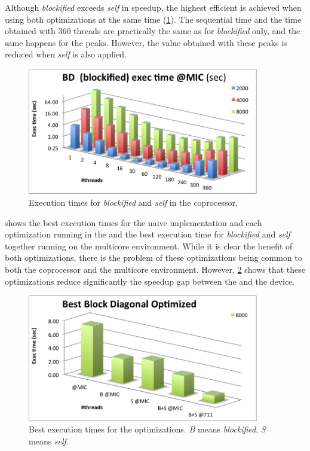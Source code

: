 \documentclass[../thesis]{subfiles}
\begin{document}
	Although \emph{blockified} exceeds \emph{self} in speedup, the highest efficient is achieved when using both optimizations at the same time (\cref{fig:mic:optims:blockified_self:times}). The sequential time and the time obtained with 360 threads are practically the same as for \emph{blockified} only, and the same happens for the peaks. However, the value obtained with these peaks is reduced when \emph{self} is also applied.

	\begin{figure}[p]
		\begin{center}
			\includegraphics[width=0.9\textwidth]{assets/images/mic/optims/mic-blockified.png}
		\end{center}
		\caption{Execution times for \emph{blockified} and \emph{self} in the \intel\xeonphi coprocessor.}
		\label{fig:mic:optims:blockified_self:times}
	\end{figure}

	 shows the best execution times for the naive implementation and each optimization running in the \intel\xeonphi and the best execution time for \emph{blockified} and \emph{self} together running on the multicore environment. While it is clear the benefit of both optimizations, there is the problem of these optimizations being common to both the coprocessor and the multicore environment. However, \cref{fig:mic:optims:best:times} shows that these optimizations reduce significantly the speedup gap between the \cpu and the device.

	\begin{figure}[p]
		\begin{center}
			\includegraphics[width=0.9\textwidth]{assets/images/mic/optims/best.png}
		\end{center}
		\caption{Best execution times for the optimizations. \emph{B} means \emph{blockified}, \emph{S} means \emph{self}.}
		\label{fig:mic:optims:best:times}
	\end{figure}
\end{document}
